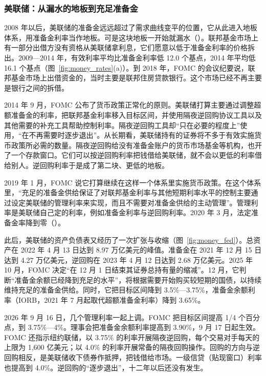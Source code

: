 \subsubsection{美联储：从漏水的地板到充足准备金}
2008 年以后，美联储的准备金远远超过了需求曲线变平的位置，它从此进入地板体系，用准备金利率当作地板。可是这块地板一开始就漏水（）。联邦基金市场上有一部分出借方没有资格从美联储拿利息，它们愿意以低于准备金利率的价格拆出。2009—2014 年，有效利率平均比准备金利率低 12.0 个基点，2014 年平均低 16.1 个基点（图~\ref{fig:money_rates}(a)）\cite{fred2026m}。到 2018 年，FOMC 的会议纪要说，联邦基金市场上出借资金的，当时主要是联邦住房贷款银行\cite{fomc2018nov}。这个市场已经不再主要是银行之间的拆借。

2014 年 9 月，FOMC 公布了货币政策正常化的原则。美联储打算主要通过调整超额准备金的利率，把联邦基金利率移入目标区间，并使用隔夜逆回购协议工具以及其他需要的补充工具帮助控制利率。隔夜逆回购工具却“只在必要的程度上”使用，“在不再需要时逐步退出”。从长期看，美联储持有的证券将不多于有效实施货币政策所必需的数量\cite{fomc2014norm}。隔夜逆回购给没有准备金账户的货币市场基金等机构，也开了一个存款窗口。它们可以按逆回购利率把钱借给美联储，就不会以更低的利率借给别人。逆回购利率于是成了第二块、更低的地板。

2019 年 1 月，FOMC 说它打算继续在这样一个体系里实施货币政策。在这个体系里，“充足的准备金供给保证了对联邦基金利率与其他短期利率水平的控制主要通过设定美联储的管理利率来实现，而且不需要对准备金供给的主动管理”\cite{fomc2019ample}。管理利率是美联储自己定的利率，例如准备金利率与逆回购利率。2020 年 3 月，法定准备金率降到零（）。

此后，美联储的资产负债表又经历了一次扩张与收缩（图~\ref{fig:money_fed}）。总资产在 2022 年 4 月 13 日达到 8.97 万亿美元的峰值。准备金在 2021 年 12 月 15 日达到 4.27 万亿美元，逆回购在 2023 年 4 月 12 日达到 2.68 万亿美元\cite{fred2026m}。2025 年 10 月，FOMC 决定“在 12 月 1 日结束其证券总持有量的缩减”\cite{fomc2025oct}。12 月，它判断“准备金余额已经降到充足的水平”，将根据需要开始购买较短期的国债，以持续维持充足的准备金供给。同时，它把目标区间降到 3.5\%—3.75\%，准备金余额利率（IORB，2021 年 7 月起取代超额准备金利率）降到 3.65\%\cite{fomc2025dec}。

2026 年 9 月 16 日，几个管理利率一起上调。FOMC 把目标区间提高 1/4 个百分点，到 3.75\%—4\%。理事会把准备金余额利率提高到 3.90\%，9 月 17 日起生效。FOMC 还指示纽约联储，以 3.75\% 的利率开展隔夜逆回购，每个交易对手每天的上限为 1,600 亿美元；以 4.0\% 的利率开展常备的隔夜回购操作。回购的方向与逆回购相反，是美联储收下债券作抵押，把钱借给市场。一级信贷（贴现窗口）利率也提高到 4.0\%\cite{fomc2026sep}。逆回购的“逐步退出”，十二年以后还没有发生。

